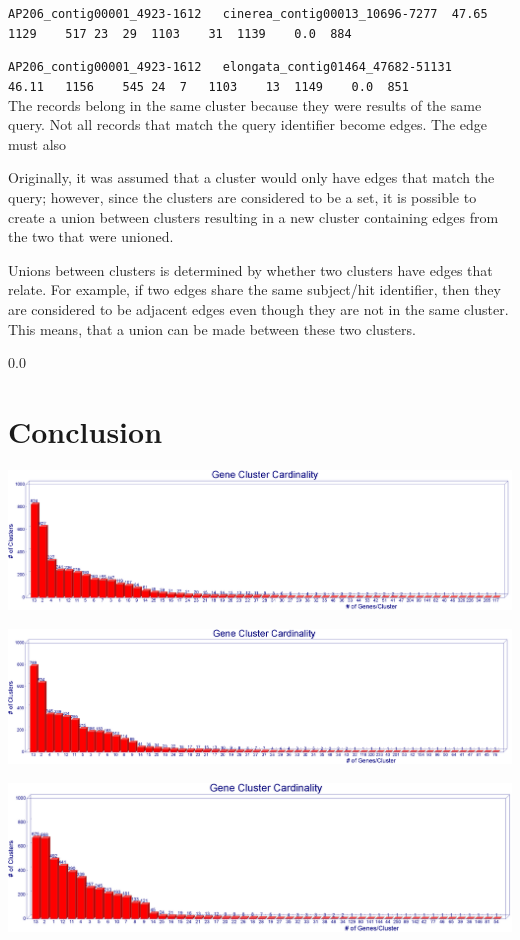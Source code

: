 \documentclass[11pt,notitlepage]{article}
\begin{document}
  \noindent \verb|AP206_contig00001_4923-1612	cinerea_contig00013_10696-7277	47.65	1129	517	23	29	1103	31	1139	0.0	 884|

  \noindent \verb|AP206_contig00001_4923-1612	elongata_contig01464_47682-51131	46.11	1156	545	24	7	1103	13	1149	0.0	 851|
  \\

  The records belong in the same cluster because they were results of the same query. Not
  all records that match the query identifier become edges. The edge must also


  Originally,
  it was assumed that a cluster would only have edges that match the query; however, since
  the clusters are considered to be a set, it is possible to create a union between clusters 
  resulting in a new cluster containing edges from the two that were unioned.

  Unions between clusters is determined by whether two clusters have edges that relate. For example,
  if two edges share the same subject/hit identifier, then they are considered to be adjacent edges
  even though they are not in the same cluster. This means, that a union can be made between
  these two clusters.

  {\setlength{\baselineskip}%
           {0.0\baselineskip}
  \section*{\hfill Conclusion}
  \hrulefill \par}

  \includegraphics[width=145mm]{i30_a50_graph.png}
  
  \includegraphics[width=145mm]{i30_a70_graph.png}
  
  \includegraphics[width=145mm]{i30_a90_graph.png}
  
\end{document}
